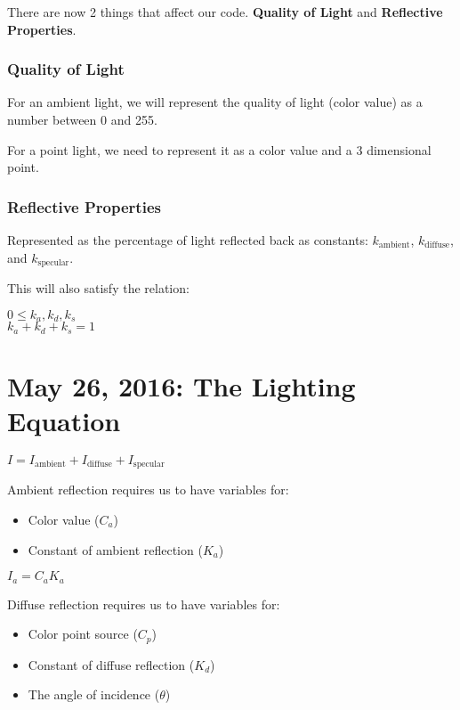 \documentclass[11pt,fleqn]{article}
\theoremstyle{definition}
\begin{document}
There are now 2 things that affect our code. \textbf{Quality of Light} and
\textbf{Reflective Properties}.

\subsubsection{Quality of Light}

For an ambient light, we will represent the quality of light (color value) as a
number between 0 and 255.

For a point light, we need to represent it as a color value and a 3 dimensional
point.

\subsubsection{Reflective Properties}

Represented as the percentage of light reflected back as constants:
$k_{\text{ambient}}$, $k_{\text{diffuse}}$, and $k_{\text{specular}}$.

This will also satisfy the relation:

\begin{center}
    $0 \leq k_a, k_d, k_s$ \\
    $k_a + k_d + k_s = 1$
\end{center}

\section{May 26, 2016: The Lighting Equation}

\begin{center}
    $I = I_{\text{ambient}} + I_{\text{diffuse}} + I_{\text{specular}}$
\end{center}

Ambient reflection requires us to have variables for:
\begin{itemize}
    \item Color value ($C_a$)
    \item Constant of ambient reflection ($K_a$)
\end{itemize}

\begin{center}
    $I_a = C_aK_a$
\end{center}

Diffuse reflection requires us to have variables for:
\begin{itemize}
    \item Color point source ($C_p$)
    \item Constant of diffuse reflection ($K_d$)
    \item The angle of incidence ($\theta$)
\end{itemize}
\end{document}
